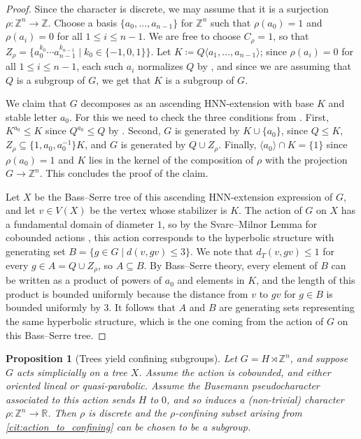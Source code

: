\documentclass[reqno,12pt]{amsart}\setcounter{tocdepth}{1}
\newtheorem{proposition}[theorem]{Proposition}
\theoremstyle{definition}
\newcommand{\Z}{\mathbb{Z}}
\newcommand{\R}{\mathbb{R}}
\numberwithin{equation}{section}
\begin{document}
\begin{proof}
Since the character is discrete, we may assume that it is a surjection $\rho \colon \Z^n \to \Z$. Choose a basis $\{a_0,\dots,a_{n-1}\}$ for $\Z^n$ such that $\rho(a_0)=1$ and $\rho(a_i)=0$ for all $1\le i\le n-1$. We are free to choose $C_\rho=1$, so that $Z_\rho=\{a_0^{k_0}\cdots a_{n-1}^{k_{n-1}}\mid k_0\in\{-1,0,1\}\}$. Let $K\coloneqq Q\langle a_1,\dots,a_{n-1}\rangle$; since $\rho(a_i)=0$ for all $1\le i\le n-1$, each such $a_i$ normalizes $Q$ by \StayInConf, and since we are assuming that $Q$ is a subgroup of $G$, we get that $K$ is a subgroup of $G$.

We claim that $G$ decomposes as an ascending HNN-extension with base $K$ and stable letter $a_0$. For this we need to check the three conditions from \cite[Lemma 3.1]{ascending}. First, $K^{a_0}\le K$ since $Q^{a_0}\le Q$ by \StayInConf. Second, $G$ is generated by $K\cup\{a_0\}$, since $Q\le K$, $Z_\rho\subseteq \{1,a_0,a_0^{-1}\}K$, and $G$ is generated by $Q\cup Z_\rho$. Finally, $\langle a_0\rangle\cap K=\{1\}$ since $\rho(a_0)=1$ and $K$ lies in the kernel of the composition of $\rho$ with the projection $G\to\Z^n$. This concludes the proof of the claim.

Let $X$ be the Bass--Serre tree of this ascending HNN-extension expression of $G$, and let $v \in V(X)$ be the vertex whose stabilizer is $K$. The action of $G$ on $X$ has a fundamental domain of diameter $1$, so by the Svarc--Milnor Lemma for cobounded actions \cite[Lemma 3.11]{ABO}, this action corresponds to the hyperbolic structure with generating set
\(B = \{ g \in G \mid d(v, gv) \leq 3 \}.\)
We note that $d_T(v, gv) \leq 1$ for every $g \in A = Q \cup Z_\rho$, so $A \subseteq B$. By Bass--Serre theory, every element of $B$ can be written as a product of powers of $a_0$ and elements in $K$, and the length of this product is bounded uniformly because the distance from $v$ to $gv$ for $g\in B$ is bounded uniformly by $3$. It follows that $A$ and $B$ are generating sets representing the same hyperbolic structure, which is the one coming from the action of $G$ on this Bass--Serre tree.
\end{proof}

\begin{proposition}[Trees yield confining subgroups] \label{prop:trees_to_subgroups}
Let $G=H\rtimes \Z^n$, and suppose $G$ acts simplicially on a tree $X$. Assume the action is cobounded, and either oriented lineal or quasi-parabolic. Assume the Busemann pseudocharacter associated to this action sends $H$ to $0$, and so induces a (non-trivial) character $\rho\colon \Z^n\to\R$. Then $\rho$ is discrete and the $\rho$-confining subset arising from \cref{cit:action_to_confining} can be chosen to be a subgroup.
\end{proposition}
\end{document}
